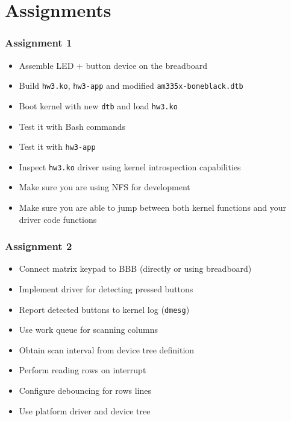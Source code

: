 \documentclass[aspectratio=169,usenames,dvipsnames]{beamer}
\begin{document}
\section{Assignments}

\begin{frame}
  \frametitle{Assignment 1}
  \begin{itemize}
    \item Assemble LED + button device on the breadboard
    \item Build \texttt{hw3.ko}, \texttt{hw3-app} and modified
          \texttt{am335x-boneblack.dtb}
    \item Boot kernel with new \texttt{dtb} and load \texttt{hw3.ko}
    \item Test it with Bash commands
    \item Test it with \texttt{hw3-app}
    \item Inspect \texttt{hw3.ko} driver using kernel introspection capabilities
    \item Make sure you are using NFS for development
    \item Make sure you are able to jump between both kernel functions and
          your driver code functions
  \end{itemize}
\end{frame}

\begin{frame}
  \frametitle{Assignment 2}
  \begin{itemize}
    \item Connect matrix keypad to BBB (directly or using breadboard)
    \item Implement driver for detecting pressed buttons
    \item Report detected buttons to kernel log (\texttt{dmesg})
    \item Use work queue for scanning columns
    \item Obtain scan interval from device tree definition
    \item Perform reading rows on interrupt
    \item Configure debouncing for rows lines
    \item Use platform driver and device tree
  \end{itemize}
\end{frame}
\end{document}
